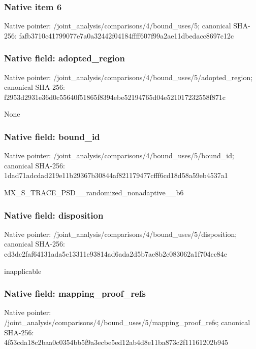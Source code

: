 \documentclass[10pt,a4paper]{article}
\begin{document}
\subsubsection{Native item 6}
Native pointer: /joint\_\allowbreak{}analysis/comparisons/4/bound\_\allowbreak{}uses/5; canonical SHA-256: fafb3710c41799077e7a0a32442f04184ffff607f99a2ae11dbedacc8697c12c

\subsubsection{Native field: adopted\_\allowbreak{}region}
Native pointer: /joint\_\allowbreak{}analysis/comparisons/4/bound\_\allowbreak{}uses/5/adopted\_\allowbreak{}region; canonical SHA-256: f2953d2931e36d0c55640f51865f8394ebe52194765d04e521017232558f871c

\begingroup\raggedright\sloppy None\par\endgroup

\subsubsection{Native field: bound\_\allowbreak{}id}
Native pointer: /joint\_\allowbreak{}analysis/comparisons/4/bound\_\allowbreak{}uses/5/bound\_\allowbreak{}id; canonical SHA-256: 1dad71adcdad219e11b29367b30844af821179477cfff6cd18d58a59eb4537a1

\begingroup\raggedright\sloppy MX\_\allowbreak{}S\_\allowbreak{}TRACE\_\allowbreak{}PSD\_\allowbreak{}\_\allowbreak{}randomized\_\allowbreak{}nonadaptive\_\allowbreak{}\_\allowbreak{}b6\par\endgroup

\subsubsection{Native field: disposition}
Native pointer: /joint\_\allowbreak{}analysis/comparisons/4/bound\_\allowbreak{}uses/5/disposition; canonical SHA-256: cd3dc2faf64131ada5c13311e93814ad6ada2d5b7ae8b2c083062a1f704cc84e

\begingroup\raggedright\sloppy inapplicable\par\endgroup

\subsubsection{Native field: mapping\_\allowbreak{}proof\_\allowbreak{}refs}
Native pointer: /joint\_\allowbreak{}analysis/comparisons/4/bound\_\allowbreak{}uses/5/mapping\_\allowbreak{}proof\_\allowbreak{}refs; canonical SHA-256: 4f53cda18c2baa0c0354bb5f9a3ecbe5ed12ab4d8e11ba873c2f11161202b945
\end{document}
